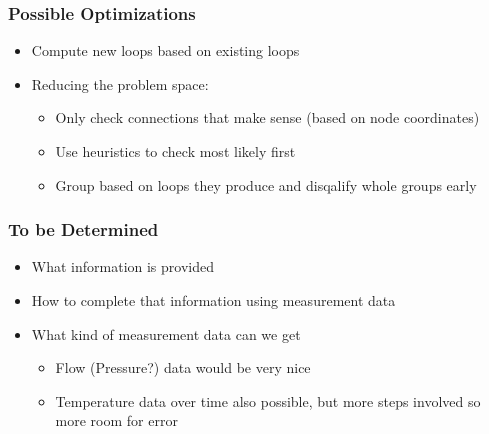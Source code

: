 \documentclass{beamer}
\begin{document}
\begin{frame}
\frametitle{Possible Optimizations}
  \begin{itemize}
    \item Compute new loops based on existing loops
    \item Reducing the problem space:
    \begin{itemize}
      \item Only check connections that make sense (based on node coordinates)
      \item Use heuristics to check most likely first
      \item Group based on loops they produce and disqalify whole groups early
    \end{itemize}
  \end{itemize}
\end{frame}

\begin{frame}
\frametitle{To be Determined}
  \begin{itemize}
    \item What information is provided
    \item How to complete that information using measurement data
    \item What kind of measurement data can we get
      \begin{itemize}
        \item Flow (Pressure?) data would be very nice
        \item Temperature data over time also possible, but more steps involved so more room for error
      \end{itemize}
  \end{itemize}
\end{frame}
\end{document}
